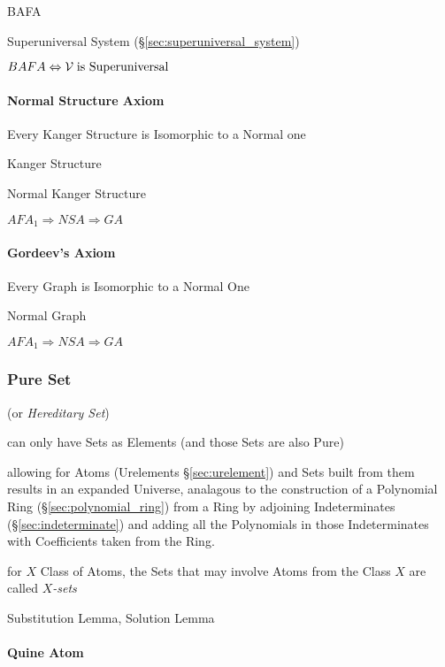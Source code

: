 BAFA

Superuniversal System (\S\ref{sec:superuniversal_system})

$BAFA \Leftrightarrow \mathcal{V} \;\text{is Superuniversal}$



\paragraph{Normal Structure Axiom}
\label{sec:normal_structure_axiom}\hfill

Every Kanger Structure is Isomorphic to a Normal one

Kanger Structure

Normal Kanger Structure

$AFA_1 \Rightarrow NSA \Rightarrow GA$


\paragraph{Gordeev's Axiom}\label{sec:gordeevs_axiom}\hfill

Every Graph is Isomorphic to a Normal One

Normal Graph

$AFA_1 \Rightarrow NSA \Rightarrow GA$



\subsubsection{Pure Set}\label{sec:pure_set}

(or \emph{Hereditary Set})

can only have Sets as Elements (and those Sets are also Pure)
\cite{aczel88}

allowing for Atoms (Urelements \S\ref{sec:urelement}) and Sets built
from them results in an expanded Universe, analagous to the
construction of a Polynomial Ring (\S\ref{sec:polynomial_ring}) from a
Ring by adjoining Indeterminates (\S\ref{sec:indeterminate}) and
adding all the Polynomials in those Indeterminates with Coefficients
taken from the Ring.

for $X$ Class of Atoms, the Sets that may involve Atoms from the Class
$X$ are called \emph{$X$-sets}

Substitution Lemma, Solution Lemma



\paragraph{Quine Atom}\label{sec:quine_atom}\hfill

